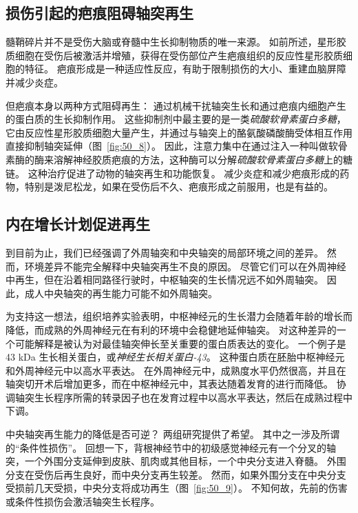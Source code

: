 \subsection{损伤引起的疤痕阻碍轴突再生}

髓鞘碎片并不是受伤大脑或脊髓中生长抑制物质的唯一来源。
如前所述，星形胶质细胞在受伤后被激活并增殖，获得在受伤部位产生疤痕组织的反应性星形胶质细胞的特征。
疤痕形成是一种适应性反应，有助于限制损伤的大小、重建血脑屏障并减少炎症。


但疤痕本身以两种方式阻碍再生：
通过机械干扰轴突生长和通过疤痕内细胞产生的蛋白质的生长抑制作用。
这些抑制剂中最主要的是一类\textit{硫酸软骨素蛋白多糖}，它由反应性星形胶质细胞大量产生，并通过与轴突上的酪氨酸磷酸酶受体相互作用直接抑制轴突延伸（图~\ref{fig:50_8}）。
因此，注意力集中在通过注入一种叫做软骨素酶的酶来溶解神经胶质疤痕的方法，这种酶可以分解\textit{硫酸软骨素蛋白多糖}上的糖链。
这种治疗促进了动物的轴突再生和功能恢复。
减少炎症和减少疤痕形成的药物，特别是泼尼松龙，如果在受伤后不久、疤痕形成之前服用，也是有益的。



\subsection{内在增长计划促进再生}

到目前为止，我们已经强调了外周轴突和中央轴突的局部环境之间的差异。
然而，环境差异不能完全解释中央轴突再生不良的原因。
尽管它们可以在外周神经中再生，但在沿着相同路径行驶时，中枢轴突的生长情况远不如外周轴突。
因此，成人中央轴突的再生能力可能不如外周轴突。


为支持这一想法，组织培养实验表明，中枢神经元的生长潜力会随着年龄的增长而降低，而成熟的外周神经元在有利的环境中会稳健地延伸轴突。
对这种差异的一个可能解释是被认为对最佳轴突伸长至关重要的蛋白质表达的变化。
一个例子是 43 kDa 生长相关蛋白，或\textit{神经生长相关蛋白-43}。
这种蛋白质在胚胎中枢神经元和外周神经元中以高水平表达。
在外周神经元中，成熟度水平仍然很高，并且在轴突切开术后增加更多，而在中枢神经元中，其表达随着发育的进行而降低。
协调轴突生长程序所需的转录因子也在发育过程中以高水平表达，然后在成熟过程中下调。


中央轴突再生能力的降低是否可逆？
两组研究提供了希望。
其中之一涉及所谓的“条件性损伤”。
回想一下，背根神经节中的初级感觉神经元有一个分叉的轴突，一个外围分支延伸到皮肤、肌肉或其他目标，一个中央分支进入脊髓。
外围分支在受伤后再生良好，而中央分支再生较差。
然而，如果外围分支在中央分支受损前几天受损，中央分支将成功再生（图~\ref{fig:50_9}）。
不知何故，先前的伤害或条件性损伤会激活轴突生长程序。


